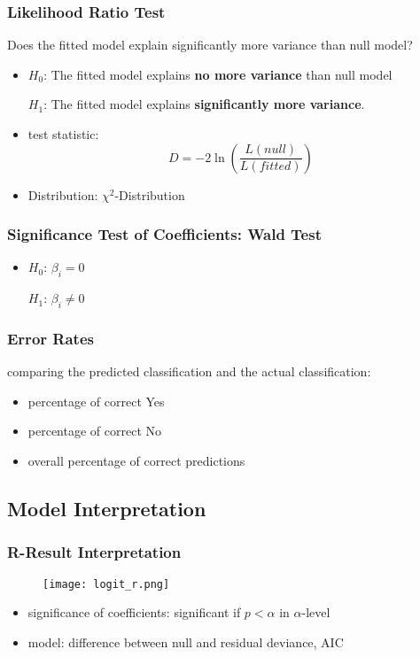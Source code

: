 \subsubsection{Likelihood Ratio Test}
Does the fitted model explain significantly more variance than null model?
\begin{itemize}
	\item $H_0$: The fitted model explains \textbf{no more variance} than null model
	
	$H_1$: The fitted model explains \textbf{significantly more variance}.
	\item test statistic:
	$$D = -2 \ln (\frac{L(null)}{L(fitted)})$$
	\item Distribution: $\chi^2$-Distribution
\end{itemize}

\subsubsection{Significance Test of Coefficients: Wald Test}
\begin{itemize}
	\item $H_0$: $\beta_i = 0$
	
	$H_1$: $\beta_i \neq 0$
\end{itemize}

\subsubsection{Error Rates}
comparing the predicted classification and the actual classification:
\begin{itemize}
	\item percentage of correct Yes
	\item percentage of correct No
	\item overall percentage of correct predictions
\end{itemize}

\subsection{Model Interpretation}
\subsubsection{R-Result Interpretation}
\begin{figure}[H]
	\centering
	\texttt{[image: logit\_r.png]}
\end{figure}
\begin{itemize}
	\item significance of coefficients: significant if $p < \alpha$ in $\alpha$-level
	\item model: difference between null and residual deviance, AIC
\end{itemize}

